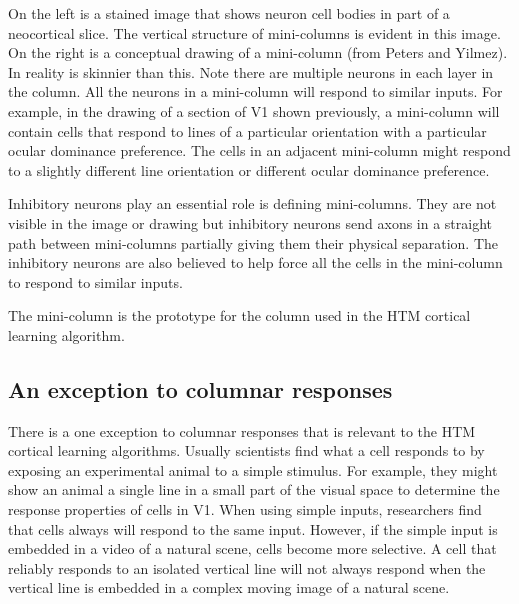 \documentclass{report}
\begin{document}
\begin{figure}
\end{figure}

On the left is a stained image that shows neuron cell bodies in part
of a neocortical slice. The vertical structure of mini-columns is
evident in this image. On the right is a conceptual drawing of a
mini-column (from Peters and Yilmez). In reality is skinnier than
this. Note there are multiple neurons in each layer in the column. All
the neurons in a mini-column will respond to similar inputs. For
example, in the drawing of a section of V1 shown previously, a
mini-column will contain cells that respond to lines of a particular
orientation with a particular ocular dominance preference. The cells
in an adjacent mini-column might respond to a slightly different line
orientation or different ocular dominance preference.

Inhibitory neurons play an essential role is defining
mini-columns. They are not visible in the image or drawing but
inhibitory neurons send axons in a straight path between mini-columns
partially giving them their physical separation. The inhibitory
neurons are also believed to help force all the cells in the
mini-column to respond to similar inputs.

The mini-column is the prototype for the column used in the HTM
cortical learning algorithm.

\subsection*{An exception to columnar responses}
There is a one exception to columnar responses that is relevant to the
HTM cortical learning algorithms. Usually scientists find what a cell
responds to by exposing an experimental animal to a simple
stimulus. For example, they might show an animal a single line in a
small part of the visual space to determine the response properties of
cells in V1. When using simple inputs, researchers find that cells
always will respond to the same input. However, if the simple input is
embedded in a video of a natural scene, cells become more selective. A
cell that reliably responds to an isolated vertical line will not
always respond when the vertical line is embedded in a complex moving
image of a natural scene.
\end{document}
